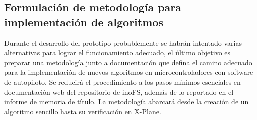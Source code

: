 \subsection{Formulación de metodología para implementación de algoritmos}

Durante el desarrollo del prototipo probablemente se habrán intentado varias alternativas para lograr el funcionamiento adecuado, el último objetivo es preparar una metodología junto a documentación que defina el camino adecuado para la implementación de nuevos algoritmos en microcontroladores con software de autopiloto. Se reducirá el procedimiento a los pasos mínimos esenciales en documentación web del repositorio de inoFS, además de lo reportado en el informe de memoria de título. La metodología abarcará desde la creación de un algoritmo sencillo hasta su verificación en X-Plane.